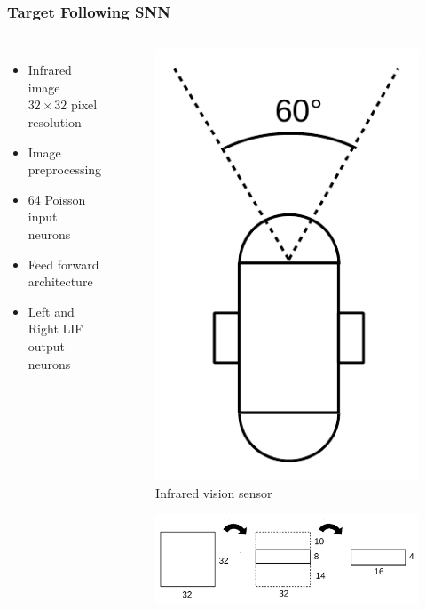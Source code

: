 \begin{frame}
	\frametitle{Target Following SNN}
	\begin{columns}
			\begin{itemize}
				\item <1-> Infrared image $32 \times 32 $ pixel resolution
				\item <2-> Image preprocessing
				\item <3-> 64 Poisson input neurons
				\item <3-> Feed forward architecture
				\item <3-> Left and Right LIF output neurons
			\end{itemize}
			\begin{overprint}
				\begin{figure}
					\centering
					\includegraphics[height=0.7\textheight]{img/sensors_a.pdf}
					\caption{Infrared vision sensor}
					\label{fig:sensor_a}
				\end{figure}
				\begin{figure}
					\centering
					\includegraphics[width=\textwidth]{img/img_pre.pdf}

\end{figure}
\end{overprint}
\end{columns}
\end{frame}

